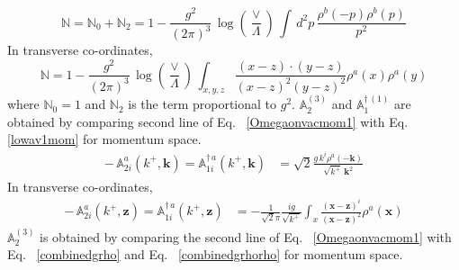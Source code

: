 \documentclass[aps,prd,amsmath,amssymb,nofootinbib]{revtex4-2}
\def\mf#1{\mathbb{#1}}
\numberwithin{equation}{section}
\begin{document}
\begin{equation}\label{Ncoeffmom}
    \mf{N} =  \mf{N}_0 +  \mf{N}_2 = 1- \frac{g^{2}}{(2\pi)^{3}}\, \log{\left(\frac{\vee}{\Lambda}\right)}\,\int\, d^{2}p\,\frac{\rho^{b}(-p)\rho^{b}(p)}{p^{2}}
\end{equation}
In transverse co-ordinates,
\begin{equation}\label{eq:Ncoeffpos}
    \mf{N}  = 1 -
    \frac{g^{2}}{(2\pi)^{3}}\, \log{\left(\frac{\vee}{\Lambda}\right)}\, \int_{x,y,z}\frac{(x-z)\cdot (y-z)}{(x-z)^{2}(y-z)^{2}}\rho^{a}(x)\rho^{a}(y)
\end{equation}
where  $ \mf{N}_0=1$ and  $\mf{N}_2$ is the term proportional to $g^2$. $\mf{A}^{(3)}_{2}$ and $\mf{A}^{\dagger\, (1)}_{1}$ are obtained by comparing second line of Eq.~ \eqref{Omegaonvacmom1} with Eq.~ \eqref{lowav1mom} for momentum space. 
\begin{align}
\label{A1coeffM}
  -\,\mf{A}^{a}_{2i}(k^{+},\mathbf{k}) =  \mf{A}^{\dagger\,a}_{ 1 i}(k^{+},\mathbf{k}) & = \sqrt{2} \frac{g\,k^{i}\rho^{a}(-\mathbf{k})}{ \sqrt{k^{+}}\,\mathbf{k}^{2}} 
\end{align}
In transverse co-ordinates,
\begin{align}
\label{A1coeff}
  -\, \mf{A}^{a}_{2i}(k^{+},\mathbf{z}) =   \mf{A}^{\dagger\,a}_{1 i}(k^{+},\mathbf{z}) & = - \frac{1}{\sqrt{2}\pi}\frac{ig}{\sqrt{k^+}}\int_{x}\frac{(\mathbf{x}-\mathbf{z})^{i}}{(\mathbf{x}-\mathbf{z})^{2}} \rho^{a}(\mathbf{x}) 
\end{align}
$ \mf{A}^{(3)}_{2}$ is obtained by comparing the second line of Eq.~ \eqref{Omegaonvacmom1} with Eq.~ \eqref{combinedgrho} and Eq.~ \eqref{combinedgrhorho} for momentum space. 
\end{document}
